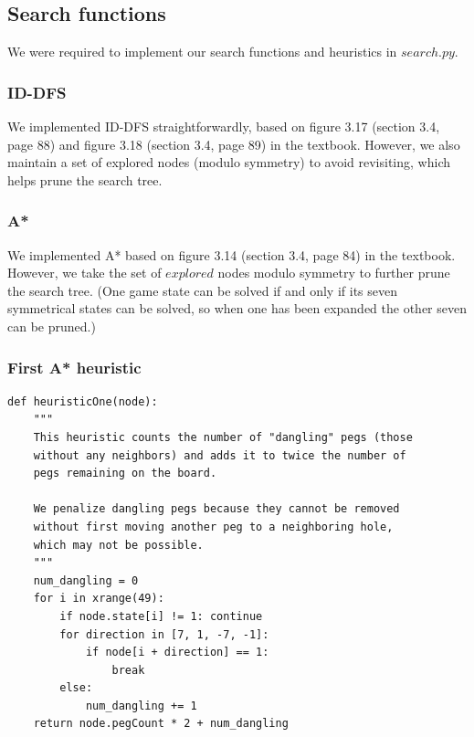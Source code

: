 \documentclass[11pt, letter]{article}
\begin{document}
\subsection{Search functions}

We were required to implement our search functions and heuristics in
\(search.py\).

\subsubsection{ID-DFS}

We implemented ID-DFS straightforwardly, based on figure 3.17 (section 3.4,
page 88) and figure 3.18 (section 3.4, page 89) in the textbook. However, we
also maintain a set of explored nodes (modulo symmetry) to avoid revisiting,
which helps prune the search tree.

\subsubsection{A*}

We implemented A* based on figure 3.14 (section 3.4, page 84) in the textbook.
However, we take the set of \(explored\) nodes modulo symmetry to further prune
the search tree. (One game state can be solved if and only if its seven
symmetrical states can be solved, so when one has been expanded the other
seven can be pruned.)

\subsubsection{First A* heuristic}

\begin{lstlisting}[frame=single]
def heuristicOne(node):
	"""
	This heuristic counts the number of "dangling" pegs (those
	without any neighbors) and adds it to twice the number of
	pegs remaining on the board.

	We penalize dangling pegs because they cannot be removed
	without first moving another peg to a neighboring hole,
	which may not be possible.
	"""
	num_dangling = 0
	for i in xrange(49):
		if node.state[i] != 1: continue
		for direction in [7, 1, -7, -1]:
			if node[i + direction] == 1:
				break
		else:
			num_dangling += 1
	return node.pegCount * 2 + num_dangling
\end{lstlisting}
\end{document}
